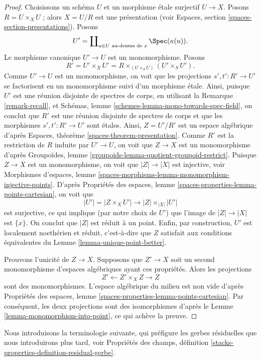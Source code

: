 \begin{proof}
Choisissons un schéma $U$ et un morphisme \'etale surjectif $U \to X$.
Posons $R = U \times_X U$ ; alors $X = U/R$ est une présentation (voir
Espaces, section \ref{spaces-section-presentations}).
Posons
$$
U' = \coprod\nolimits_{u \in U\text{ au-dessus de }x} \Spec(\kappa(u)).
$$
Le morphisme canonique $U' \to U$ est un monomorphisme. Posons
$$
R' = U' \times_X U' = R \times_{(U \times_S U)} (U' \times_S U').
$$
Comme $U' \to U$ est un monomorphisme, on voit que les projections
$s', t' : R' \to U'$ se factorisent en un monomorphisme suivi d'un
morphisme \'etale. Ainsi, puisque $U'$ est une réunion disjointe de spectres
de corps, en utilisant
la Remarque \ref{remark-recall},
et
Schémas, lemme \ref{schemes-lemma-mono-towards-spec-field},
on conclut que $R'$ est une réunion disjointe de spectres de corps et que
les morphismes $s', t' : R' \to U'$ sont \'etales. Ainsi,
$Z = U'/R'$ est un espace algébrique d'après
Espaces, théorème \ref{spaces-theorem-presentation}.
Comme $R'$ est la restriction de $R$ induite par $U' \to U$, on voit que
$Z \to X$ est un monomorphisme d'après
Groupoïdes, lemme \ref{groupoids-lemma-quotient-groupoid-restrict}.
Puisque $Z \to X$ est un monomorphisme, on voit que $|Z| \to |X|$ est
injective, voir Morphismes d'espaces, lemme
\ref{spaces-morphisms-lemma-monomorphism-injective-points}.
D'après
Propriétés des espaces, lemme \ref{spaces-properties-lemma-points-cartesian},
on voit que
$$
|U'| = |Z \times_X U'| \to |Z| \times_{|X|} |U'|
$$
est surjective, ce qui implique (par notre choix de $U'$) que
l'image de $|Z| \to |X|$ est $\{x\}$. On conclut que $|Z|$ est réduit
à un point. Enfin, par construction, $U'$ est localement noethérien et réduit,
c'est-à-dire que $Z$ satisfait aux conditions équivalentes du
Lemme \ref{lemma-unique-point-better}.

\medskip\noindent
Prouvons l'unicité de $Z \to X$. Supposons que
$Z' \to X$ soit un second monomorphisme d'espaces algébriques ayant ces
propriétés. Alors les projections
$$
Z' \longleftarrow Z' \times_X Z \longrightarrow Z
$$
sont des monomorphismes. L'espace algébrique du milieu est non vide d'après
Propriétés des espaces,
lemme \ref{spaces-properties-lemma-points-cartesian}.
Par conséquent, les deux projections sont des isomorphismes d'après le
Lemme \ref{lemma-monomorphism-into-point},
ce qui achève la preuve.
\end{proof}

\noindent
Nous introduisons la terminologie suivante, qui préfigure
les gerbes résiduelles que nous introduirons plus tard, voir
Propriétés des champs, définition
\ref{stacks-properties-definition-residual-gerbe}.

